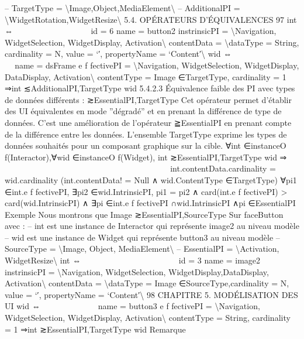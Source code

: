 \documentclass{article}
\begin{document}
– TargetType = \textbackslash{}{Image,Object,MediaElement\textbackslash{}}
– AdditionalPI = \textbackslash{}{WidgetRotation,WidgetResize\textbackslash{}}
5.4. OPÉRATEURS D’ÉQUIVALENCES
97
int ⇔















id = 6
name = button2
instrinsicPI = \textbackslash{}{Navigation, WidgetSelection,
WidgetDisplay, Activation\textbackslash{}}
contentData = \textbackslash{}{dataType = String, cardinality = N,
value = ‘′, propertyName = ‘Content′\textbackslash{}}
wid ⇔















name = dsFrame
e f fectivePI = \textbackslash{}{Navigation, WidgetSelection,
WidgetDisplay, DataDisplay,
Activation\textbackslash{}}
contentType = Image ∈TargetType,
cardinality = 1
⇒int ≲AdditionalPI,TargetType wid
5.4.2.3
Équivalence faible des PI avec types de donn\'{e}es diff\'{e}rents : ≳EssentialPI,TargetType
Cet op\'{e}rateur permet d’\'{e}tablir des UI \'{e}quivalentes en mode ”d\'{e}grad\'{e}” et en prenant la diff\'{e}rence
de type de donn\'{e}es. C’est une am\'{e}lioration de l’op\'{e}rateur ≧EssentialPI en prenant compte de la diff\'{e}rence entre les donn\'{e}es. L’ensemble TargetType exprime les types de donn\'{e}es souhait\'{e}s pour un
composant graphique sur la cible.
∀int ∈instanceO f(Interactor),∀wid ∈instanceO f(Widget),
int ≳EssentialPI,TargetType wid ⇒



































int.contentData.cardinality = wid.cardinality
(int.contentData! = Null
∧
wid.ContentType ∈TargetType)
∀pi1 ∈int.e f fectivePI,
∃pi2 ∈wid.IntrinsicPI,
pi1 = pi2
∧
card(int.e f fectivePI) > card(wid.IntrinsicPI)
∧
∃pi ∈int.e f fectivePI ∩wid.IntrinsicPI ∧pi ∈EssentialPI
Exemple
Nous montrons que Image ≳EssentialPI,SourceType Sur faceButton avec :
– int est une instance de Interactor qui repr\'{e}sente image2 au niveau mod\`{e}le
– wid est une instance de Widget qui repr\'{e}sente button3 au niveau mod\`{e}le
– SourceType = \textbackslash{}{Image, Object, MediaElement\textbackslash{}}
– EssentialPI = \textbackslash{}{Activation, WidgetResize\textbackslash{}}
int ⇔



















id = 3
name = image2
instrinsicPI = \textbackslash{}{Navigation, WidgetSelection,
WidgetDisplay,DataDisplay,
Activation\textbackslash{}}
contentData = \textbackslash{}{dataType = Image ∈SourceType,cardinality = N,
value = ‘′, propertyName = ‘Content′\textbackslash{}}
98
CHAPITRE 5. MODÉLISATION DES UI
wid ⇔











name = button3
e f fectivePI = \textbackslash{}{Navigation, WidgetSelection,
WidgetDisplay, Activation\textbackslash{}}
contentType = String,
cardinality = 1
⇒int ≳EssentialPI,TargetType wid
Remarque
\end{document}
